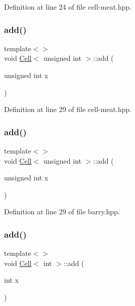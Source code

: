 Definition at line 24 of file cell-\/meat.\+hpp.

\mbox{\label{class_cell_ae22060201cf692bbf219827453d0acd2}} 
\subsubsection{\texorpdfstring{add()}{add()}\hspace{0.1cm}{\footnotesize\ttfamily [3/9]}}
{\footnotesize\ttfamily template$<$$>$ \\
void \hyperlink{class_cell}{Cell}$<$ unsigned int $>$\+::add (\begin{DoxyParamCaption}\item[{unsigned int}]{x }\end{DoxyParamCaption})\hspace{0.3cm}{\ttfamily [inline]}}



Definition at line 29 of file cell-\/meat.\+hpp.

\mbox{\label{class_cell_ae22060201cf692bbf219827453d0acd2}} 
\subsubsection{\texorpdfstring{add()}{add()}\hspace{0.1cm}{\footnotesize\ttfamily [4/9]}}
{\footnotesize\ttfamily template$<$$>$ \\
void \hyperlink{class_cell}{Cell}$<$ unsigned int $>$\+::add (\begin{DoxyParamCaption}\item[{unsigned int}]{x }\end{DoxyParamCaption})\hspace{0.3cm}{\ttfamily [inline]}}



Definition at line 29 of file barry.\+hpp.

\mbox{\label{class_cell_a74cb069c7341de33354c396465818c2f}} 
\subsubsection{\texorpdfstring{add()}{add()}\hspace{0.1cm}{\footnotesize\ttfamily [5/9]}}
{\footnotesize\ttfamily template$<$$>$ \\
void \hyperlink{class_cell}{Cell}$<$ int $>$\+::add (\begin{DoxyParamCaption}\item[{int}]{x }\end{DoxyParamCaption})\hspace{0.3cm}{\ttfamily [inline]}}



